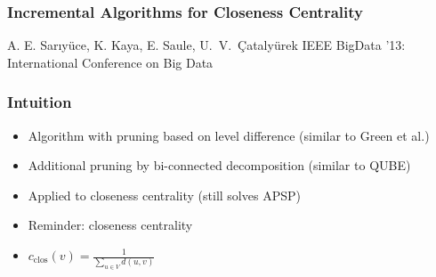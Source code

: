 \begin{frame}
  \frametitle{Incremental Algorithms for Closeness Centrality}
  \centering
  \vfill
  {\huge A. E. Sar\i y\"uce, K. Kaya, E. Saule, U.~V.~\c{C}ataly\"urek }
  \vfill
  {\large IEEE BigData '13: International Conference on Big Data}
\end{frame}


\begin{frame}
  \frametitle{Intuition}

  \begin{itemize}
    \item Algorithm with pruning based on level difference (similar to Green et al.)
    \item Additional pruning by bi-connected decomposition (similar to QUBE)
    \item Applied to closeness centrality (still solves APSP)
    \item Reminder: closeness centrality
    \item $\displaystyle c_{\mathrm{clos}}(v)=\frac{1}{\displaystyle  \sum_{u \in V} d(u,v)}$
  \end{itemize}
    
\end{frame}


